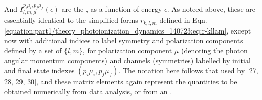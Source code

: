 \documentclass[letterpaper,table,10pt,english]{jupyterBook}
\begin{document}
\sphinxAtStartPar
And \(I_{l,m,\mu}^{p_{i}\mu_{i},p_{f}\mu_{f}}(\epsilon)\) are the {\hyperref[\detokenize{backmatter/glossary:term-radial-matrix-elements}]{}}, as a function of energy \(\epsilon\).
As noteed above, these {\hyperref[\detokenize{backmatter/glossary:term-radial-matrix-elements}]{}} are essentially identical to the simplified forms
\(r_{k,l,m}\) defined in Eqn. \eqref{equation:part1/theory_photoionization_dynamics_140723:eq:r-kllam}, except now with additional indices to label
symmetry and polarization components defined by a set of {\hyperref[\detokenize{backmatter/glossary:term-partial-waves}]{}}
\(\{l,m\}\), for polarization component \(\mu\) (denoting the photon angular
momentum components) and channels (symmetries) labelled by initial and
final state indexes \((p_{i}\mu_{i},p_{f}\mu_{f})\). The notation here
follows that used by  {[}\hyperlink{cite.backmatter/bibliography:id747}{27}, \hyperlink{cite.backmatter/bibliography:id617}{28}, \hyperlink{cite.backmatter/bibliography:id786}{29}, \hyperlink{cite.backmatter/bibliography:id750}{30}{]}, and these matrix elements again represent the quantities to be obtained numerically from data analysis, or from an .
\end{document}
